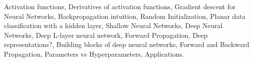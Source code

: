 \documentclass[11pt,a4paper]{moderncv}
\begin{document}
{            Activation functions,                                                          %
            Derivatives of activation functions,                                                          %
            Gradient descent for Neural Networks,                                                          %
            Backpropagation intuition,                                                          %
            Random Initialization,                                                          %
            Planar data classification with a hidden layer,                                                          %
            Shallow Neural Networks,                                                          %
            Deep Neural Networks,                                                          %
            Deep L-layer neural network,                                                          %
            Forward Propagation,                                                          %
            Deep representations?,                                                          %
            Building blocks of deep neural networks,                                                          %
            Forward and Backward Propagation,                                                          %
            Parameters vs Hyperparameters,                                                          %
            Applications.                                                          %
    }
\end{document}
